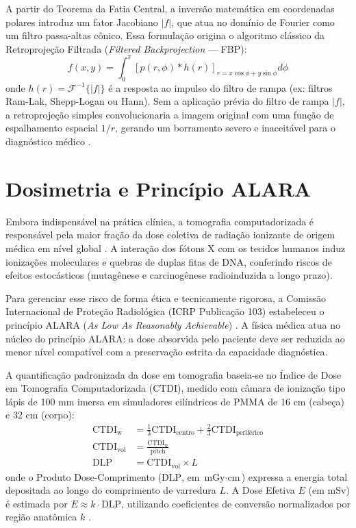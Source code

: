 \documentclass[
  12pt,
  a4paper,
  oneside
]{report}
\begin{document}
A partir do Teorema da Fatia Central, a inversão matemática em coordenadas polares introduz um fator Jacobiano $|f|$, que atua no domínio de Fourier como um filtro passa-altas cônico. Essa formulação origina o algoritmo clássico da Retroprojeção Filtrada (\emph{Filtered Backprojection} --- FBP):
\begin{equation}
  f(x, y) = \int_0^{\pi} \left[ p(r, \phi) * h(r) \right]_{r = x\cos\phi + y\sin\phi} d\phi
  \label{eq:fbp_formula}
\end{equation}
onde $h(r) = \mathcal{F}^{-1}\{|f|\}$ é a resposta ao impulso do filtro de rampa (ex: filtros Ram-Lak, Shepp-Logan ou Hann). Sem a aplicação prévia do filtro de rampa $|f|$, a retroprojeção simples convolucionaria a imagem original com uma função de espalhamento espacial $1/r$, gerando um borramento severo e inaceitável para o diagnóstico médico \cite{seeram2015}.

\section{Dosimetria e Princípio ALARA}
\label{sec:paradigma_dosimetrico}

Embora indispensável na prática clínica, a tomografia computadorizada é responsável pela maior fração da dose coletiva de radiação ionizante de origem médica em nível global \cite{mccollough2026}. A interação dos fótons X com os tecidos humanos induz ionizações moleculares e quebras de duplas fitas de DNA, conferindo riscos de efeitos estocásticos (mutagênese e carcinogênese radioinduzida a longo prazo).

Para gerenciar esse risco de forma ética e tecnicamente rigorosa, a Comissão Internacional de Proteção Radiológica (ICRP Publicação 103) estabeleceu o princípio ALARA (\emph{As Low As Reasonably Achievable}) \cite{icrp103_2007}. A física médica atua no núcleo do princípio ALARA: a dose absorvida pelo paciente deve ser reduzida ao menor nível compatível com a preservação estrita da capacidade diagnóstica.

A quantificação padronizada da dose em tomografia baseia-se no Índice de Dose em Tomografia Computadorizada ($\text{CTDI}$), medido com câmara de ionização tipo lápis de 100 mm imersa em simuladores cilíndricos de PMMA de 16 cm (cabeça) e 32 cm (corpo):
\begin{align}
  \text{CTDI}_{\text{w}} &= \frac{1}{3} \text{CTDI}_{\text{centro}} + \frac{2}{3} \text{CTDI}_{\text{periférico}} \label{eq:ctdi_w} \\
  \text{CTDI}_{\text{vol}} &= \frac{\text{CTDI}_{\text{w}}}{\text{pitch}} \label{eq:ctdi_vol} \\
  \text{DLP} &= \text{CTDI}_{\text{vol}} \times L \label{eq:dlp_def}
\end{align}
onde o Produto Dose-Comprimento ($\text{DLP}$, em $\text{mGy}\cdot\text{cm}$) expressa a energia total depositada ao longo do comprimento de varredura $L$. A Dose Efetiva $E$ (em $\text{mSv}$) é estimada por $E \approx k \cdot \text{DLP}$, utilizando coeficientes de conversão normalizados por região anatômica $k$ \cite{icrp103_2007}.
\end{document}
